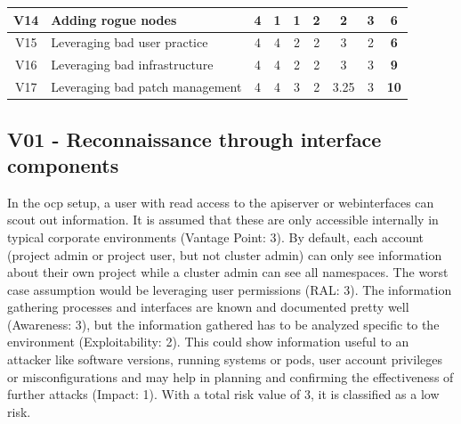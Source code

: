 \begin{landscape}
\begin{table}[]
{\begin{tabular}{|c|l|cccc|cc|c|}
V14             & Adding rogue nodes                                                                     & 4                                        & 1                              & 1                                        & 2                    & 2                                      & 3            & \textbf{6}           \\ \hline
V15             & Leveraging bad user practice                                                           & 4                                        & 4                              & 2                                        & 2                    & 3                                      & 2            & \textbf{6}           \\ \hline
V16             & Leveraging bad infrastructure                                                          & 4                                        & 4                              & 2                                        & 2                    & 3                                      & 3            & \textbf{9}           \\ \hline
V17             & Leveraging bad patch management                                                        & 4                                        & 4                              & 3                                        & 2                    & 3.25                                   & 3            & \textbf{10}          \\ \hline
\end{tabular}%
}
\end{table}
\end{landscape}

\subsection{V01 - Reconnaissance through interface components}

In the \gls{ocp} setup, a user with read access to the apiserver or webinterfaces can scout out information. It is assumed that these are only accessible internally in typical corporate environments (Vantage Point: 3).
By default, each account (project admin or project user, but not cluster admin) can only see information about their own project while a cluster admin can see all namespaces.
The worst case assumption would be leveraging user permissions (RAL: 3).
The information gathering processes and interfaces are known and documented pretty well (Awareness: 3), but the information gathered has to be analyzed specific to the environment (Exploitability: 2).
This could show information useful to an attacker like software versions, running systems or pods, user account privileges or misconfigurations and may help in planning and confirming the effectiveness of further attacks (Impact: 1).
With a total risk value of 3, it is classified as a low risk. \\


